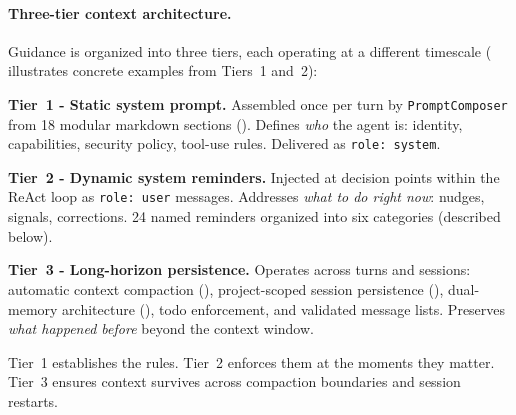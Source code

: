 \paragraph{Three-tier context architecture.} Guidance is organized into three tiers, each operating at a different timescale ( illustrates concrete examples from Tiers~1 and~2):

\begin{packedenumerate}
\item \textbf{Tier~1 - Static system prompt.} Assembled once per turn by \texttt{PromptComposer} from 18 modular markdown sections (). Defines \emph{who} the agent is: identity, capabilities, security policy, tool-use rules. Delivered as \texttt{role:~system}.

\item \textbf{Tier~2 - Dynamic system reminders.} Injected at decision points within the ReAct loop as \texttt{role:~user} messages. Addresses \emph{what to do right now}: nudges, signals, corrections. 24 named reminders organized into six categories (described below).

\item \textbf{Tier~3 - Long-horizon persistence.} Operates across turns and sessions: automatic context compaction (), project-scoped session persistence (), dual-memory architecture (), todo enforcement, and validated message lists. Preserves \emph{what happened before} beyond the context window.
\end{packedenumerate}

Tier~1 establishes the rules. Tier~2 enforces them at the moments they matter. Tier~3 ensures context survives across compaction boundaries and session restarts.

